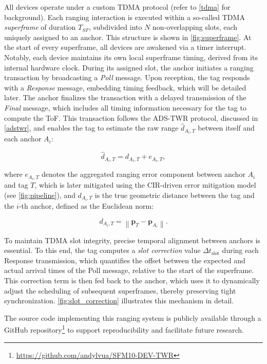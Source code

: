 All devices operate under a custom TDMA protocol (refer to \autoref{tdma} for background). Each ranging interaction is executed within a so-called TDMA \textit{superframe} of duration $T_{SF}$, subdivided into $N$ non-overlapping slots, each uniquely assigned to an anchor. This structure is shown in \autoref{fig:superframe}. At the start of every superframe, all devices are awakened via a timer interrupt. Notably, each device maintains its own local superframe timing, derived from its internal hardware clock. During its assigned slot, the anchor initiates a ranging transaction by broadcasting a \emph{Poll} message. Upon reception, the tag responds with a \emph{Response} message, embedding timing feedback, which will be detailed later. The anchor finalizes the transaction with a delayed transmission of the \emph{Final} message, which includes all timing information necessary for the tag to compute the ToF. This transaction follows the ADS-TWR protocol, discussed in \autoref{adstwr}, and enables the tag to estimate the raw range $\hat{d}_{A_i,T}$ between itself and each anchor $A_i$:

\begin{equation}
\hat{d}_{A_i,T} = d_{A_i,T} + e_{A_i,T} \label{eq:raw_range} ,
\end{equation}\label{range}

where $e_{A_i,T}$ denotes the aggregated ranging error component between anchor $A_i$ and tag $T$, which is later mitigated using the CIR-driven error mitigation model (see \autoref{fig:pipeline}), and $d_{A_i,T}$ is the true geometric distance between the tag and the $i$-th anchor, defined as the Euclidean norm:

\begin{equation} 
d_{A_i,T} = \left\| \mathbf{p}_T - \mathbf{p}_{A_i} \right\| .\label{eq:true_distance} 
\end{equation}

To maintain TDMA slot integrity, precise temporal alignment between anchors is essential. To this end, the tag computes a \textit{slot correction} value $\Delta t_{\text{slot}}$ during each Response transmission, which quantifies the offset between the expected and actual arrival times of the Poll message, relative to the start of the superframe. This correction term is then fed back to the anchor, which uses it to dynamically adjust the scheduling of subsequent superframes, thereby preserving tight synchronization. \autoref{fig:slot_correction} illustrates this mechanism in detail.

The source code implementing this ranging system is publicly available through a GitHub repository\footnote{\url{https://github.com/andylvua/SFM10-DEV-TWR}} to support reproducibility and facilitate future research.


